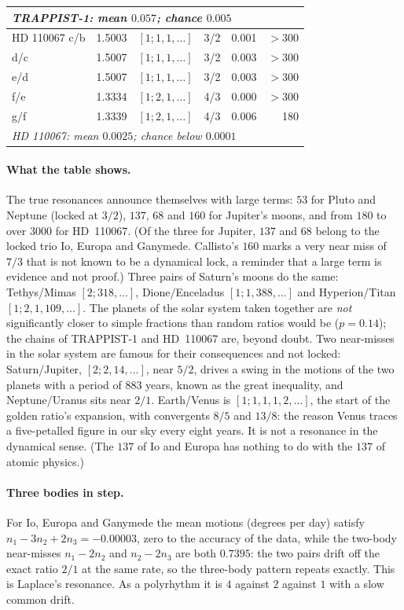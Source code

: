 \begin{table}[ht]
\begin{tabular}{llllrr}
\multicolumn{6}{l}{\emph{TRAPPIST-1: mean $0.057$; chance $0.005$}}\\
\hline
HD 110067 c/b & 1.5003 & $[1;1,1,\ldots]$ & 3/2 & 0.001 & $>300$\\
d/c & 1.5007 & $[1;1,1,\ldots]$ & 3/2 & 0.003 & $>300$\\
e/d & 1.5007 & $[1;1,1,\ldots]$ & 3/2 & 0.003 & $>300$\\
f/e & 1.3334 & $[1;2,1,\ldots]$ & 4/3 & 0.000 & $>300$\\
g/f & 1.3339 & $[1;2,1,\ldots]$ & 4/3 & 0.006 & 180\\
\multicolumn{6}{l}{\emph{HD 110067: mean $0.0025$; chance below $0.0001$}}\\
\hline
\end{tabular}
\end{table}

\paragraph{What the table shows.} The true resonances announce themselves with large terms: $53$ for
Pluto and Neptune (locked at $3/2$), $137$, $68$ and $160$ for Jupiter's moons, and from $180$ to over
$3000$ for HD~110067. (Of the three for Jupiter, $137$ and $68$
belong to the locked trio Io, Europa and Ganymede. Callisto's $160$ marks a very near miss of $7/3$ that
is not known to be a dynamical lock, a reminder that a large term is evidence and not proof.) Three pairs of Saturn's moons
do the same: Tethys/Mimas $[2;318,\ldots]$, Dione/Enceladus $[1;1,388,\ldots]$ and Hyperion/Titan
$[1;2,1,109,\ldots]$. The planets of the solar system taken together are \emph{not} significantly closer
to simple fractions than random ratios would be ($p=0.14$); the chains of TRAPPIST-1 and HD~110067 are,
beyond doubt. Two near-misses in the solar system are famous for their consequences and not locked:
Saturn/Jupiter, $[2;2,14,\ldots]$, near $5/2$, drives a swing in the motions of the two planets with a
period of $883$ years, known as the great inequality, and
Neptune/Uranus sits near $2/1$. Earth/Venus is $[1;1,1,1,2,\ldots]$, the start of the golden ratio's
expansion, with convergents $8/5$ and $13/8$: the reason Venus traces a five-petalled figure in our sky
every eight years. It is not a resonance in the dynamical sense. (The $137$ of Io and Europa has nothing
to do with the $137$ of atomic physics.)

\paragraph{Three bodies in step.} For Io, Europa and Ganymede the mean motions (degrees per day) satisfy
$n_1-3n_2+2n_3=-0.00003$, zero to the accuracy of the data, while the two-body near-misses $n_1-2n_2$ and
$n_2-2n_3$ are both $0.7395$: the two pairs drift off the exact ratio $2/1$ at the same rate, so the
three-body pattern repeats exactly. This is Laplace's resonance. As a polyrhythm it is $4$ against $2$
against $1$ with a slow common drift.

